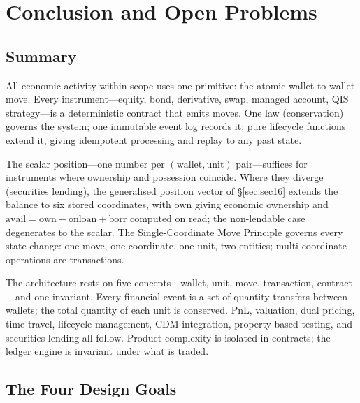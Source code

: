 \section{Conclusion and Open Problems}
\label{sec:sec19}
\label{sec:conclusion}

\subsection{Summary}

All economic activity within scope uses one primitive: the atomic wallet-to-wallet move. Every instrument---equity, bond, derivative, swap, managed account, QIS strategy---is a deterministic contract that emits moves. One law (conservation) governs the system; one immutable event log records it; pure lifecycle functions extend it, giving idempotent processing and replay to any past state.

The scalar position---one number per $(\text{wallet},\text{unit})$ pair---suffices for instruments where ownership and possession coincide. Where they diverge (securities lending), the generalised position vector of \S\ref{sec:sec16} extends the balance to six stored coordinates, with $\mathrm{own}$ giving economic ownership and $\mathrm{avail}=\mathrm{own}-\mathrm{onloan}+\mathrm{borr}$ computed on read; the non-lendable case degenerates to the scalar. The Single-Coordinate Move Principle governs every state change: one move, one coordinate, one unit, two entities; multi-coordinate operations are transactions.

The architecture rests on five concepts---wallet, unit, move, transaction, contract---and one invariant. Every financial event is a set of quantity transfers between wallets; the total quantity of each unit is conserved. PnL, valuation, dual pricing, time travel, lifecycle management, CDM integration, property-based testing, and securities lending all follow. Product complexity is isolated in contracts; the ledger engine is invariant under what is traded.

\subsection{The Four Design Goals}

